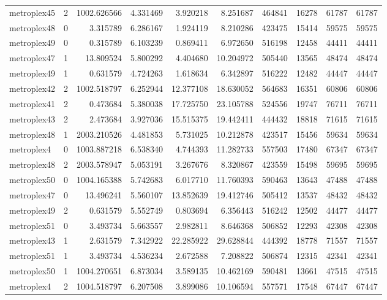 \begin{longtable}{|l|r|r|r|r|r|r|r|r|r|}
metroplex45 & 2 & 1002.626566 & 4.331469 & 3.920218 & 8.251687 & 464841 & 16278 & 61787 & 61787 \\
metroplex48 & 0 & 3.315789 & 6.286167 & 1.924119 & 8.210286 & 423475 & 15414 & 59575 & 59575 \\
metroplex49 & 0 & 0.315789 & 6.103239 & 0.869411 & 6.972650 & 516198 & 12458 & 44411 & 44411 \\
metroplex47 & 1 & 13.809524 & 5.800292 & 4.404680 & 10.204972 & 505440 & 13565 & 48474 & 48474 \\
metroplex49 & 1 & 0.631579 & 4.724263 & 1.618634 & 6.342897 & 516222 & 12482 & 44447 & 44447 \\
metroplex42 & 2 & 1002.518797 & 6.252944 & 12.377108 & 18.630052 & 564683 & 16351 & 60806 & 60806 \\
metroplex41 & 2 & 0.473684 & 5.380038 & 17.725750 & 23.105788 & 524556 & 19747 & 76711 & 76711 \\
metroplex43 & 2 & 2.473684 & 3.927036 & 15.515375 & 19.442411 & 444432 & 18818 & 71615 & 71615 \\
metroplex48 & 1 & 2003.210526 & 4.481853 & 5.731025 & 10.212878 & 423517 & 15456 & 59634 & 59634 \\
metroplex4 & 0 & 1003.887218 & 6.538340 & 4.744393 & 11.282733 & 557503 & 17480 & 67347 & 67347 \\
metroplex48 & 2 & 2003.578947 & 5.053191 & 3.267676 & 8.320867 & 423559 & 15498 & 59695 & 59695 \\
metroplex50 & 0 & 1004.165388 & 5.742683 & 6.017710 & 11.760393 & 590463 & 13643 & 47488 & 47488 \\
metroplex47 & 0 & 13.496241 & 5.560107 & 13.852639 & 19.412746 & 505412 & 13537 & 48432 & 48432 \\
metroplex49 & 2 & 0.631579 & 5.552749 & 0.803694 & 6.356443 & 516242 & 12502 & 44477 & 44477 \\
metroplex51 & 0 & 3.493734 & 5.663557 & 2.982811 & 8.646368 & 506852 & 12293 & 42308 & 42308 \\
metroplex43 & 1 & 2.631579 & 7.342922 & 22.285922 & 29.628844 & 444392 & 18778 & 71557 & 71557 \\
metroplex51 & 1 & 3.493734 & 4.536234 & 2.672588 & 7.208822 & 506874 & 12315 & 42341 & 42341 \\
metroplex50 & 1 & 1004.270651 & 6.873034 & 3.589135 & 10.462169 & 590481 & 13661 & 47515 & 47515 \\
metroplex4 & 2 & 1004.518797 & 6.207508 & 3.899086 & 10.106594 & 557571 & 17548 & 67447 & 67447 \\

\end{longtable}
